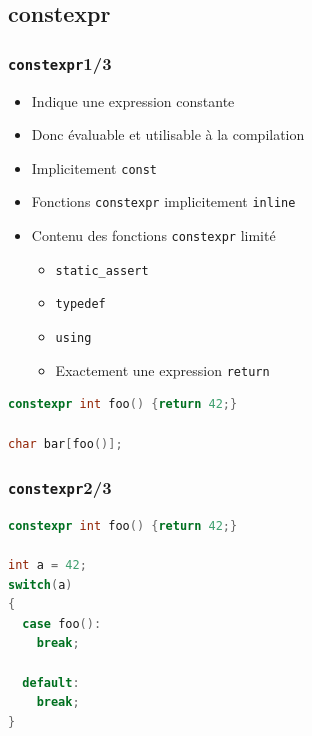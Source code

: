 \documentclass[C++.tex]{subfiles}
\begin{document}
\subsection*{constexpr}
\begin{frame}[fragile]
	\frametitle{\lstinline|constexpr|\titlehfill{}1/3}
	\begin{itemize}
		\item Indique une expression constante
		\item Donc évaluable et utilisable à la compilation
		\item Implicitement \lstinline|const|


		\item Fonctions \lstinline|constexpr| implicitement \lstinline|inline|
		\item Contenu des fonctions \lstinline|constexpr| limité
		\begin{itemize}
			\item \lstinline|static_assert|
			\item \lstinline|typedef|
			\item \lstinline|using|
			\item Exactement une expression \lstinline|return|
		\end{itemize}

	\end{itemize}

	\begin{lstlisting}[language=C++]
constexpr int foo() {return 42;}

char bar[foo()];\end{lstlisting}
\end{frame}

\begin{frame}[fragile]
	\frametitle{\lstinline|constexpr|\titlehfill{}2/3}
	\begin{lstlisting}[language=C++]
constexpr int foo() {return 42;}

int a = 42;
switch(a)
{
  case foo():
    break;

  default:
    break;
}\end{lstlisting}
\end{frame}
\end{document}
